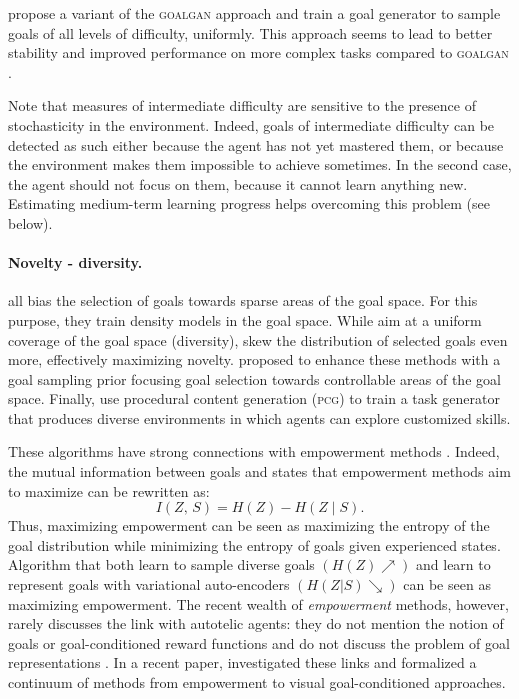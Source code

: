 \cite{settersolver} propose a variant of the \textsc{goalgan} approach and train a goal generator to sample goals of all levels of difficulty, uniformly. This approach seems to lead to better stability and improved performance on more complex tasks compared to \textsc{goalgan} \cite{goalgan}.

Note that measures of intermediate difficulty are sensitive to the presence of stochasticity in the environment. Indeed, goals of intermediate difficulty can be detected as such either because the agent has not yet mastered them, or because the environment makes them impossible to achieve sometimes. In the second case, the agent should not focus on them, because it cannot learn anything new. Estimating medium-term learning progress helps overcoming this problem (see below).
 
 
\paragraph{Novelty - diversity.}  \cite{warde2018unsupervised,pong2019skew,pitis2020maximum} all bias the selection of goals towards sparse areas of the goal space. For this purpose, they train density models in the goal space. While \cite{warde2018unsupervised,pong2019skew} aim at a uniform coverage of the goal space (diversity), \cite{pitis2020maximum} skew the distribution of selected goals even more, effectively maximizing novelty. \cite{kovac2020grimgep} proposed to enhance these methods with a goal sampling prior focusing goal selection towards controllable areas of the goal space. Finally, \cite{Fang-RSS-21} use procedural content generation (\textsc{pcg}) to train a task generator that produces diverse environments in which agents can explore customized skills. 

These algorithms have strong connections with empowerment methods \cite{mohamed_variational_2015,gregor2016variational,achiam_variational_2018,eysenbach2018diversity,campos_explore_2020,sharma_dynamics-aware_2020,choi_variational_2021}. Indeed, the mutual information between goals and states that empowerment methods aim to maximize can be rewritten as: 
\begin{equation*}
    I(Z,\,S) = H(Z) - H(Z\mid S).
\end{equation*}
Thus, maximizing empowerment can be seen as maximizing the entropy of the goal distribution while minimizing the entropy of goals given experienced states. Algorithm that both learn to sample diverse goals $(H(Z)\nearrow)$ and learn to represent goals with variational auto-encoders $(H(Z|S)\searrow)$ can be seen as maximizing empowerment. The recent wealth of \textit{empowerment} methods, however, rarely discusses the link with autotelic agents: they do not mention the notion of goals or goal-conditioned reward functions and do not discuss the problem of goal representations \cite{gregor2016variational,achiam_variational_2018,eysenbach2018diversity,campos_explore_2020,sharma_dynamics-aware_2020}. In a recent paper, \cite{choi_variational_2021} investigated these links and formalized a continuum of methods from empowerment to visual goal-conditioned approaches. 

